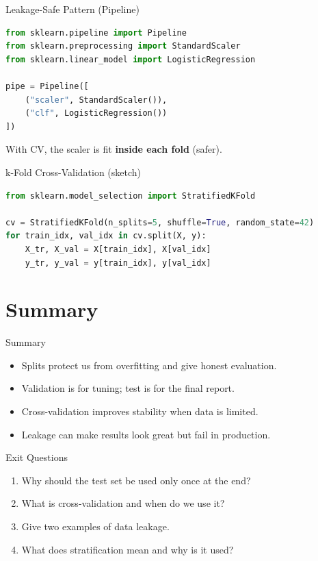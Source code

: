 \documentclass[aspectratio=169]{beamer}
\begin{document}
\begin{frame}[fragile]{Leakage-Safe Pattern (Pipeline)}
  \begin{lstlisting}[language=Python]
from sklearn.pipeline import Pipeline
from sklearn.preprocessing import StandardScaler
from sklearn.linear_model import LogisticRegression

pipe = Pipeline([
    ("scaler", StandardScaler()),
    ("clf", LogisticRegression())
])
  \end{lstlisting}
  \vspace{0.3em}
  With CV, the scaler is fit \textbf{inside each fold} (safer).
\end{frame}

\begin{frame}[fragile]{k-Fold Cross-Validation (sketch)}
  \begin{lstlisting}[language=Python]
from sklearn.model_selection import StratifiedKFold

cv = StratifiedKFold(n_splits=5, shuffle=True, random_state=42)
for train_idx, val_idx in cv.split(X, y):
    X_tr, X_val = X[train_idx], X[val_idx]
    y_tr, y_val = y[train_idx], y[val_idx]
  \end{lstlisting}
\end{frame}

\section{Summary}
\label{sec:summary}

\begin{frame}{Summary}
  \begin{itemize}
    \item Splits protect us from overfitting and give honest evaluation.
    \item Validation is for tuning; test is for the final report.
    \item Cross-validation improves stability when data is limited.
    \item Leakage can make results look great but fail in production.
  \end{itemize}
  \slidesources{\AIMLUnitIIISources}
\end{frame}

\begin{frame}{Exit Questions}
  \begin{enumerate}
    \item Why should the test set be used only once at the end?
    \item What is cross-validation and when do we use it?
    \item Give two examples of data leakage.
    \item What does stratification mean and why is it used?
  \end{enumerate}
\end{frame}
\end{document}

